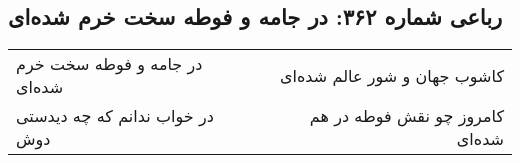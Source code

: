 \begin{center}
\section*{رباعی شماره ۳۶۲: در جامه و فوطه سخت خرم شده‌ای}
\label{sec:sh362}
\begin{longtable}{l p{0.5cm} r}
در جامه و فوطه سخت خرم شده‌ای
&&
کاشوب جهان و شور عالم شده‌ای
\\
در خواب ندانم که چه دیدستی دوش
&&
کامروز چو نقش فوطه در هم شده‌ای
\\
\end{longtable}
\end{center}
